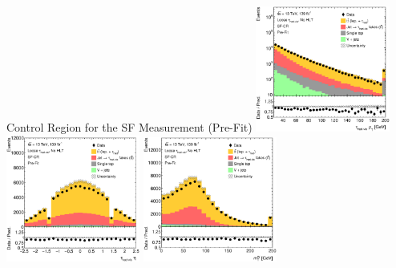 \documentclass[11pt, xcolor={dvipsnames}, aspectratio=169, notes]{beamer}
\begin{document}
\begin{frame}{Control Region for the SF Measurement (Pre-Fit)}
  \includegraphics[width=0.33\textwidth]{ttbarSF/prefit_sfcr/PTVR}%
  \includegraphics[width=0.33\textwidth]{ttbarSF/prefit_sfcr/ETAVR}%
  \includegraphics[width=0.33\textwidth]{ttbarSF/prefit_sfcr/MTWVR}
\end{frame}

\end{document}
